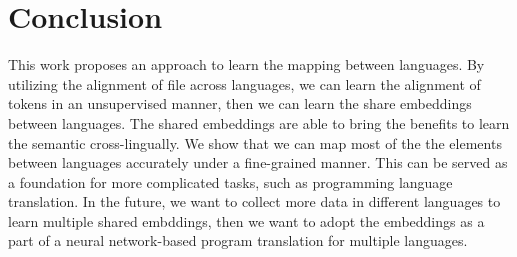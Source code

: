 \section{Conclusion}
This work proposes an approach to learn the mapping between languages. By utilizing the alignment of file across languages, we can learn the alignment of tokens in an unsupervised manner, then we can learn the share embeddings between languages. The shared embeddings are able to bring the benefits to learn the semantic cross-lingually. We show that we can map most of the the elements between languages accurately under a fine-grained manner. This can be served as a foundation for more complicated tasks, such as programming language translation. In the future, we want to collect more data in different languages to learn multiple shared embddings, then we want to adopt the embeddings as a part of a neural network-based program translation for multiple languages. 



\begin{acks}

\end{acks}
